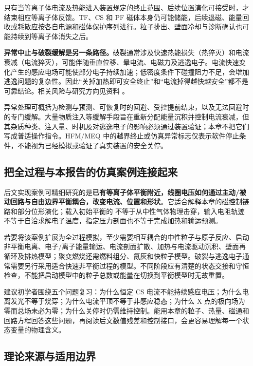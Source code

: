 \documentclass[12pt,fontset=none]{ctexart}
\numberwithin{equation}{section}
\numberwithin{table}{section}
\numberwithin{figure}{section}
\newcommand{\code}[1]{\texttt{\expandafter\seqsplit\expandafter{\detokenize{#1}}}}
\begin{document}
只有当等离子体电流及热能进入装置规定的终止范围、后续位置演化可接受时，才结束相应等离子体反馈。TF、CS 和 PF 磁体本身仍可能储能，后续退磁、能量回收或耗散应按各自电源和磁体保护序列进行。粒子排出、壁面冷却与诊断确认也可能持续到等离子体消失之后。

\textbf{异常中止与破裂缓解是另一条路径。}破裂通常涉及快速热能损失（热猝灭）和电流衰减（电流猝灭），可能伴随垂直位移、晕电流、电磁力及逃逸电子。电流快速变化产生的感应电场可能使部分电子持续加速；低密度条件下碰撞阻力不足，会增加逃逸问题的复杂性。因此``关掉加热即可安全终止''和``电流掉得越快越安全''都不是可靠结论。相关风险与研究方向见资料 \cite{C8,C9}。

异常处理可概括为检测与预测、可恢复时的回避、受控提前结束，以及无法回避时的专门缓解。大量物质注入等缓解手段旨在重新分配能量沉积并控制电流衰减，但其杂质种类、注入量、时机及对逃逸电子的影响必须通过装置验证；本章不把它们写成普适操作指令。HFM/MEQ 中的越界终止或仿真异常标志仅表示软件停止条件，不能视为已经模拟或验证了真实装置的安全关停。

\subsection{把全过程与本报告的仿真案例连接起来}\label{sec:cycle-scope}

后文实现案例可精细研究的是\textbf{已有等离子体平衡附近，线圈电压如何通过主动/被动回路与自由边界平衡耦合，改变电流、位置和形状}。它适合解释本章的磁控制链路和部分位形演化；载入初始平衡的 \code{reset} 不等于从中性气体物理击穿，输入电阻轨迹不等于自洽求解电子温度，指定压力剖面也不等于完成加热和输运预测。

若要将该案例扩展为全过程模拟，至少需要相互耦合的中性粒子与原子反应、启动非平衡电离、电子/离子能量输运、电流剖面扩散、加热与电流驱动沉积、壁面再循环及排热模型；聚变燃烧还需燃料组分、氦灰和快粒子模型。破裂与逃逸电子通常需要另行采用适合快速非平衡过程的模型。不同阶段应有清楚的状态交接和守恒检查，不能把启动模型中的粒子总数或能量在切换到平衡模型时无故重置。

建议初学者围绕五个问题复习：为什么恒定 CS 电流不能持续感应电压；为什么电离发光不等于烧穿；为什么电流平顶不等于非感应稳态；为什么 X 点的极向场为零而总场未必为零；为什么关停时仍需维持控制。能用本章的粒子、热量、磁通和回路方程回答这些问题，再阅读后文数值残差和控制接口，会更容易理解每一个状态变量的物理含义。

\subsection{理论来源与适用边界}\label{sec:cycle-sources}
\end{document}
